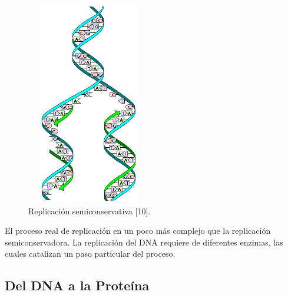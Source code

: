 \begin{figure} [h]
		\hspace*{4.5cm}\includegraphics[width=2.1209in,height=3.5000in]{image/replicacionSemiconservativa2.png}
		\caption{Replicación semiconservativa [10].}		
		\label{semi}
\end{figure}				

El proceso real de replicación en un poco más complejo que la replicación semiconservadora. La replicación del DNA requiere de diferentes enzimas, las cuales catalizan un paso particular del proceso. 

\subsection{Del DNA a la Proteína}
